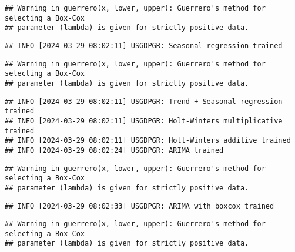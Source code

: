 \documentclass[
]{article}
\begin{document}
\begin{verbatim}
## Warning in guerrero(x, lower, upper): Guerrero's method for selecting a Box-Cox
## parameter (lambda) is given for strictly positive data.
\end{verbatim}

\begin{verbatim}
## INFO [2024-03-29 08:02:11] USGDPGR: Seasonal regression trained
\end{verbatim}

\begin{verbatim}
## Warning in guerrero(x, lower, upper): Guerrero's method for selecting a Box-Cox
## parameter (lambda) is given for strictly positive data.
\end{verbatim}

\begin{verbatim}
## INFO [2024-03-29 08:02:11] USGDPGR: Trend + Seasonal regression trained
## INFO [2024-03-29 08:02:11] USGDPGR: Holt-Winters multiplicative trained
## INFO [2024-03-29 08:02:11] USGDPGR: Holt-Winters additive trained
## INFO [2024-03-29 08:02:24] USGDPGR: ARIMA trained
\end{verbatim}

\begin{verbatim}
## Warning in guerrero(x, lower, upper): Guerrero's method for selecting a Box-Cox
## parameter (lambda) is given for strictly positive data.
\end{verbatim}

\begin{verbatim}
## INFO [2024-03-29 08:02:33] USGDPGR: ARIMA with boxcox trained
\end{verbatim}

\begin{verbatim}
## Warning in guerrero(x, lower, upper): Guerrero's method for selecting a Box-Cox
## parameter (lambda) is given for strictly positive data.
\end{verbatim}
\end{document}
